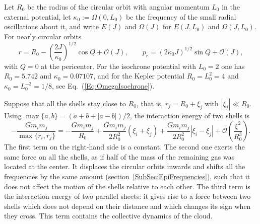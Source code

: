 Let $R_0$ be the radius of the circular orbit with angular momentum $L_0$ in the external potential, let $\kappa_0 := \Omega(0,L_0)$ be the frequency of the small radial oscillations about it, and write $E(J)$ and $\Omega(J)$ for $E(J,L_0)$ and $\Omega(J,L_0)$. For nearly circular orbits
\begin{equation}
r = R_0 - \left( \frac{2J}{\kappa_0} \right)^{1/2}\cos Q + \mathcal{O}(J),\qquad
p_r = \left( 2\kappa_0 J \right)^{1/2}\sin Q + \mathcal{O}(J),
\label{Eq:Epicycle}
\end{equation}
with $Q = 0$ at the pericenter. For the isochrone potential with $L_0 = 2$ one has $R_0 = 5.742$ and $\kappa_0 = 0.07107$, and for the Kepler potential $R_0 = L_0^2 = 4$ and $\kappa_0 = L_0^{-3} = 1/8$, see Eq.~(\ref{Eq:OmegaIsochrone}).

Suppose that all the shells stay close to $R_0$, that is, $r_j = R_0 + \xi_j$ with $|\xi_j|\ll R_0$. Using $\max\{ a,b \} = (a + b + |a - b|)/2$, the interaction energy of two shells is
\begin{equation}
-\frac{G m_i m_j}{\max\{ r_i,r_j \}} = -\frac{G m_i m_j}{R_0}
 + \frac{G m_i m_j}{2R_0^2}\left( \xi_i + \xi_j \right)
 + \frac{G m_i m_j}{2R_0^2}\left| \xi_i - \xi_j \right|
 + \mathcal{O}\left( \frac{\xi^2}{R_0^3} \right).
\label{Eq:PairExpansion}
\end{equation}
The first term on the right-hand side is a constant. The second one exerts the same force on all the shells, as if half of the mass of the remaining gas was located at the center. It displaces the circular orbits inwards and shifts all the frequencies by the same amount (section~\ref{SubSec:EpiFrequencies}), such that it does not affect the motion of the shells relative to each other. The third term is the interaction energy of two parallel sheets: it gives rise to a force between two shells which does not depend on their distance and which changes its sign when they cross. This term contains the collective dynamics of the cloud.

